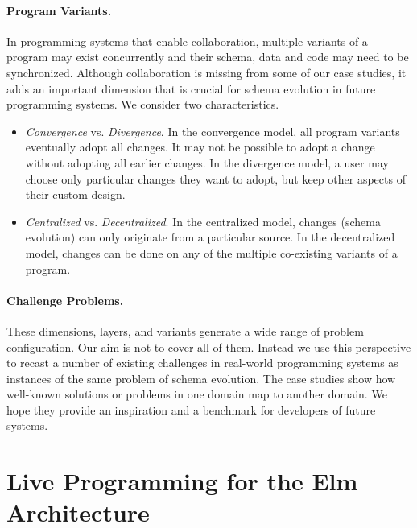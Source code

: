 \documentclass[english,crc]{programming}
\begin{document}
\vspace{-0.4em}
\paragraph{Program Variants.}
In programming systems that enable collaboration, multiple variants of a program may exist
concurrently and their schema, data and code may need to be synchronized. Although collaboration
is missing from some of our case studies, it adds an important dimension that is crucial for
schema evolution in future programming systems. We consider two characteristics.

\begin{itemize}
\item \emph{Convergence} vs. \emph{Divergence}. In the convergence model, all program variants
  eventually adopt all changes. It may not be possible to adopt a change without adopting
  all earlier changes. In the divergence model, a user may choose only
  particular changes they want to adopt, but keep other aspects of their custom design.
\item \emph{Centralized} vs. \emph{Decentralized}. In the centralized model, changes (schema evolution) can only originate from a particular source. In the decentralized model,
  changes can be done on any of the multiple co-existing variants of a program.
\end{itemize}

\vspace{-0.4em}
\paragraph{Challenge Problems.}
These dimensions, layers, and variants generate a wide range of problem configuration.
Our aim is not to cover all of them. Instead we use this perspective to recast a number of
existing challenges in real-world programming systems as instances of the same problem of
schema evolution. The case studies show how well-known solutions or problems in one domain
map to another domain. We hope they provide an inspiration and a benchmark for
developers of future systems.


\section{Live Programming for the Elm Architecture}
\label{sec:elm}
\end{document}
